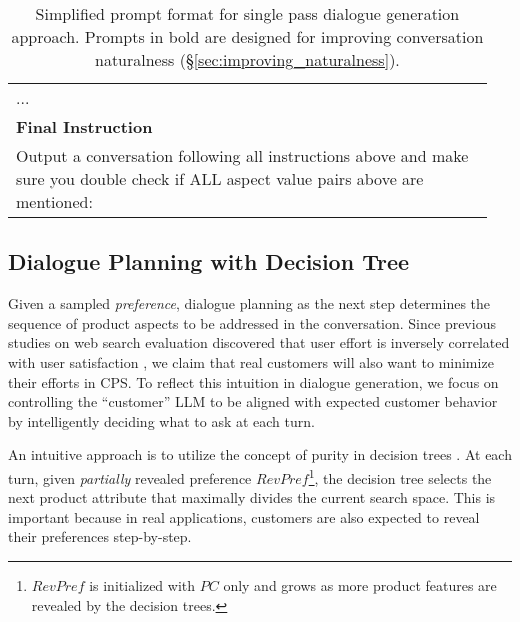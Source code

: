 \begin{table}
\begin{center}
\begin{tabular}{p{0.95\linewidth} }
  ... \\\hdashline
\textbf{Final Instruction} \\
Output a conversation following all instructions above and make sure you double check if ALL aspect value pairs above are mentioned: \\ \hline
    \end{tabular}
    \caption{Simplified prompt format for single pass dialogue generation approach. Prompts in bold are designed for improving conversation naturalness (\S\ref{sec:improving_naturalness}).}
    \label{tab:simple_prompt}
    \vspace{-1.5em}
\end{center}
\end{table}


\subsection{Dialogue Planning with Decision Tree} \label{sec:overall_dialogue_generation}
Given a sampled \textit{preference}, dialogue planning as the next step determines the sequence of product aspects to be addressed in the conversation. 
Since previous studies on web search evaluation discovered that user effort is inversely correlated with user satisfaction \cite{al2010review}, we claim that real customers will also want to minimize their efforts in CPS. To reflect this intuition in dialogue generation, we focus on controlling the ``customer'' LLM to be aligned with expected customer behavior by intelligently deciding what to ask at each turn.

An intuitive approach is to utilize the concept of purity in decision trees \cite{mehta1996sliq, quinlan2014c4}. At each turn, given \textit{partially} revealed preference $RevPref$\footnote{$RevPref$ is initialized with $PC$ only and grows as more product features are revealed by the decision trees.}, the decision tree selects the next product attribute that maximally divides the current search space. This is important because in real applications, customers are also expected to reveal their preferences step-by-step. 

